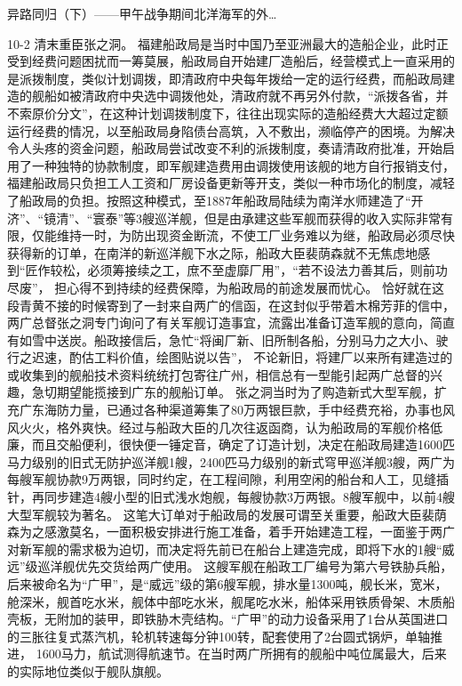 \documentclass[12pt,UTF8]{ctexbook}
\begin{document}
异路同归（下）——甲午战争期间北洋海军的外…

10-2 清末重臣张之洞。
福建船政局是当时中国乃至亚洲最大的造船企业，此时正受到经费问题困扰而一筹莫展，船政局自开始建厂造船后，经营模式上一直采用的是派拨制度，类似计划调拨，即清政府中央每年拨给一定的运行经费，而船政局建造的舰船如被清政府中央选中调拨他处，清政府就不再另外付款，“派拨各省，并不索原价分文”，在这种计划调拨制度下，往往出现实际的造船经费大大超过定额运行经费的情况，以至船政局身陷债台高筑，入不敷出，濒临停产的困境。为解决令人头疼的资金问题，船政局尝试改变不利的派拨制度，奏请清政府批准，开始启用了一种独特的协款制度，即军舰建造费用由调拨使用该舰的地方自行报销支付，福建船政局只负担工人工资和厂房设备更新等开支，类似一种市场化的制度，减轻了船政局的负担。按照这种模式，至1887年船政局陆续为南洋水师建造了“开济”、“镜清”、“寰泰”等3艘巡洋舰，但是由承建这些军舰而获得的收入实际非常有限，仅能维持一时，为防出现资金断流，不使工厂业务难以为继，船政局必须尽快获得新的订单，在南洋的新巡洋舰下水之际，船政大臣裴荫森就不无焦虑地感到“匠作较松，必须筹接续之工，庶不至虚靡厂用”，“若不设法力善其后，则前功尽废”， 担心得不到持续的经费保障，为船政局的前途发展而忧心。
恰好就在这段青黄不接的时候寄到了一封来自两广的信函，在这封似乎带着木棉芳菲的信中，两广总督张之洞专门询问了有关军舰订造事宜，流露出准备订造军舰的意向，简直有如雪中送炭。船政接信后，急忙“将闽厂新、旧所制各船，分别马力之大小、驶行之迟速，酌估工料价值，绘图贴说以告”， 不论新旧，将建厂以来所有建造过的或收集到的舰船技术资料统统打包寄往广州，相信总有一型能引起两广总督的兴趣，急切期望能揽接到广东的舰船订单。
张之洞当时为了购造新式大型军舰，扩充广东海防力量，已通过各种渠道筹集了80万两银巨款，手中经费充裕，办事也风风火火，格外爽快。经过与船政大臣的几次往返函商，认为船政局的军舰价格低廉，而且交船便利，很快便一锤定音，确定了订造计划，决定在船政局建造1600匹马力级别的旧式无防护巡洋舰1艘，2400匹马力级别的新式穹甲巡洋舰3艘，两广为每艘军舰协款9万两银，同时约定，在工程间隙，利用空闲的船台和人工，见缝插针，再同步建造4艘小型的旧式浅水炮舰，每艘协款3万两银。8艘军舰中，以前4艘大型军舰较为著名。
这笔大订单对于船政局的发展可谓至关重要，船政大臣裴荫森为之感激莫名，一面积极安排进行施工准备，着手开始建造工程，一面鉴于两广对新军舰的需求极为迫切，而决定将先前已在船台上建造完成，即将下水的1艘“威远”级巡洋舰优先交货给两广使用。 这艘军舰在船政工厂编号为第六号铁胁兵船，后来被命名为“广甲”，是“威远”级的第6艘军舰，排水量1300吨，舰长米，宽米，舱深米，舰首吃水米，舰体中部吃水米，舰尾吃水米，船体采用铁质骨架、木质船壳板，无附加的装甲，即铁胁木壳结构。“广甲”的动力设备采用了1台从英国进口的三胀往复式蒸汽机，轮机转速每分钟100转，配套使用了2台圆式锅炉，单轴推进， 1600马力，航试测得航速节。在当时两广所拥有的舰船中吨位属最大，后来的实际地位类似于舰队旗舰。
\end{document}
